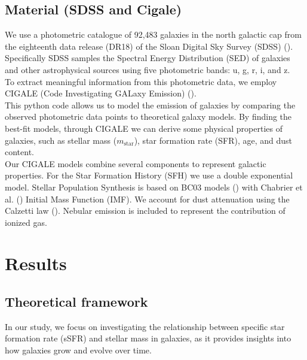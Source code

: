 \documentclass[fleqn,usenatbib]{mnras}
\begin{document}
\subsection{Material (SDSS and Cigale)}
We use a  photometric catalogue of 92,483 galaxies in the north galactic cap from the eighteenth data release (DR18) of the Sloan Digital Sky Survey (SDSS) (\citet{almeida_eighteenth_2023}). 
Specifically SDSS samples the Spectral Energy Distribution (SED) of galaxies and other astrophysical sources using five photometric bands: u, g, r, i, and z.\\%
To extract meaningful information from this photometric data, we employ CIGALE (Code Investigating GALaxy Emission) (\cite{boquien_cigale_2019}).\\
This python code allows us to model the emission of galaxies by comparing the observed photometric data points to theoretical galaxy models. 
By finding the best-fit models, through CIGALE we can derive some physical properties of galaxies, such as stellar mass ($m_\text{star}$), star formation rate (SFR), age, and dust content.\\%
Our CIGALE models combine several components to represent galactic properties. For the Star Formation History (SFH) we use a double exponential model. Stellar Population Synthesis is based on BC03 models (\cite{bruzual_charlot_2003}) with Chabrier et al. (\cite{Chabrier_2003}) Initial Mass Function (IMF). We account for dust attenuation using the Calzetti law (\cite{calzetti_dust_2000}). Nebular emission is included to represent the contribution of ionized gas.

\section{Results}

\subsection{Theoretical framework}
\label{theoretical intro}
In our study, we focus on investigating the relationship between specific star formation rate (sSFR) and stellar mass in galaxies, as it provides insights into how galaxies grow and evolve over time.
\end{document}
